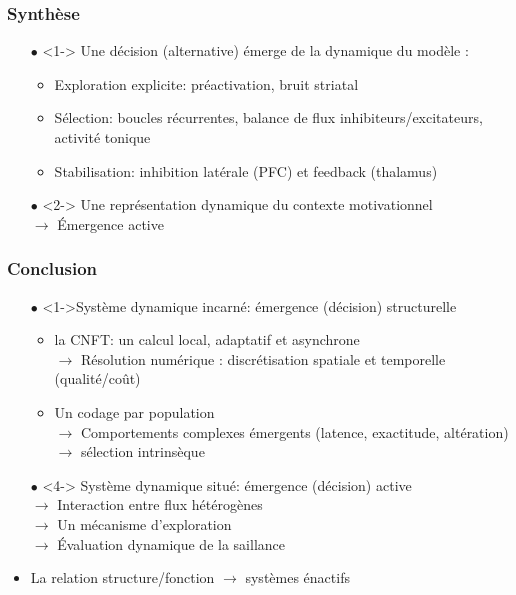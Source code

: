 \documentclass[10pt]{beamer}
\begin{document}
\begin{frame}
  \frametitle{Synth\`ese}
\begin{itemize}
\item[$\bullet$]<1-> Une d\'ecision (alternative) \'emerge de la dynamique du mod\`ele :
\begin{itemize}
\item  {{\color {blue}Exploration}} explicite: pr\'eactivation, bruit striatal
\item  {{\color {blue}S\'election}}: boucles r\'ecurrentes, balance de flux inhibiteurs/excitateurs, activit\'e tonique
\item  {{\color {blue}Stabilisation}}: inhibition lat\'erale (PFC) et feedback (thalamus)
\end{itemize}

\vspace{1cm}
\item[$\bullet$]<2-> Une repr\'esentation {{\color {blue}dynamique}} du contexte {{\color {blue}motivationnel}}\\

\vspace{1cm}\hspace{2cm}$\to$ {\color{purple}\'Emergence active} 
\end{itemize}
\end{frame}
\begin{frame}
  \frametitle{Conclusion}
\begin{itemize}
\item[$\bullet$] <1->{\color {myblue}Syst\`eme dynamique incarn\'e: \'emergence (d\'ecision) structurelle}
\begin{itemize}
\item<2-> la CNFT: un calcul local, adaptatif et asynchrone \\
$\to$ R\'esolution num\'erique : {{\color {blue}discr\'etisation spatiale et temporelle}} (qualit\'e/co\^ut)
\item<3-> Un codage par population\\
$\to$ Comportements complexes {{\color {blue}\'emergents}} (latence, exactitude, alt\'eration)\\
$\to$ s\'election  {{\color {blue}intrins\`eque}}
\end{itemize}
\item[$\bullet$]<4-> {\color {myblue}Syst\`eme dynamique situ\'e: \'emergence (d\'ecision) active}  \\
$\to$ Interaction entre flux h\'et\'erog\`enes\\
$\to$ Un m\'ecanisme {\color {blue}d'exploration}\\
$\to$ \'Evaluation dynamique de la {{\color {blue}saillance}}
\item<5-> La relation structure/fonction $\to$ {{\color {myblue}syst\`emes \'enactifs}}
\end{itemize}
\end{frame}
\end{document}
